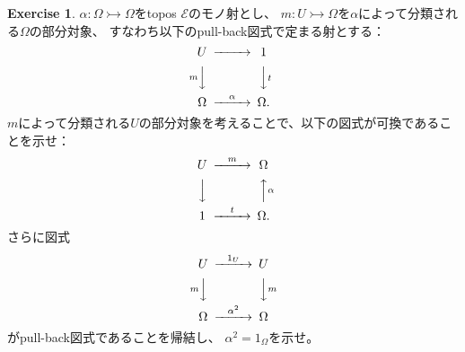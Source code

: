 \documentclass[uplatex]{jsarticle}
\theoremstyle{definition}
\newtheorem{prob}[prob]{Exercise}
\newcommand{\rtot}{\rightarrowtail}
\def\mcE{\mathcal{E}}
\begin{document}
\begin{prob}\label{prob: 1.3}
  \(\alpha:\Omega \rtot \Omega\)をtopos \(\mcE\)のモノ射とし、
  \(m:U\rtot \Omega\)を\(\alpha\)によって分類される\(\Omega\)の部分対象、
  すなわち以下のpull-back図式で定まる射とする：
  \[
  \begin{CD}
    U @>>> 1 \\
    @V m VV @VV t V \\
    \Omega @>\alpha>> \Omega.
  \end{CD}
  \]
  \(m\)によって分類される\(U\)の部分対象を考えることで、以下の図式が可換であることを示せ：
  \[
  \begin{CD}
    U @> m >> \Omega \\
    @VVV @AA \alpha A \\
    1 @> t >> \Omega.
  \end{CD}
  \]
  さらに図式
  \[
  \begin{CD}
    U @> 1_U >> U \\
    @V m VV @VV m V \\
    \Omega @> \alpha^2 >> \Omega
  \end{CD}
  \]
  がpull-back図式であることを帰結し、
  \(\alpha^2 = 1_{\Omega}\)を示せ。
\end{prob}
\end{document}
